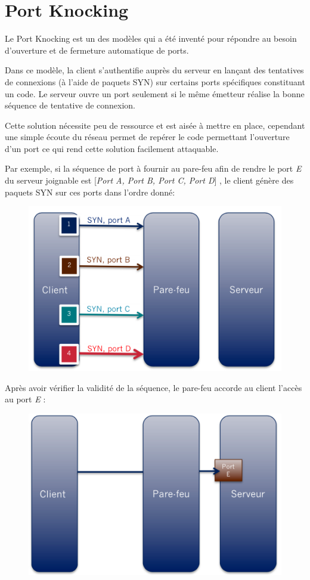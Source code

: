 \chapter{Port Knocking}

Le Port Knocking est un des modèles qui a été inventé pour répondre au besoin d'ouverture et de fermeture automatique de ports.

Dans ce modèle, la client s'authentifie auprès du serveur en lançant des tentatives de connexions (à l'aide de paquets SYN) sur certains ports spécifiques constituant un code. Le serveur ouvre un port seulement si le même émetteur réalise la bonne séquence de tentative de connexion.

Cette solution nécessite peu de ressource et est aisée à mettre en place, cependant une simple écoute du réseau permet de repérer le code permettant l'ouverture d'un port ce qui rend cette solution facilement attaquable.

Par exemple, si la séquence de port à fournir au pare-feu afin de rendre le port \emph{E} du serveur joignable est [\emph{Port A, Port B, Port C, Port D}] , le client génère des paquets SYN sur ces ports dans l'ordre donné:
\begin{figure}[h]

\centerline{\includegraphics[scale=0.4]{portknocking1}}

\end{figure}

Après avoir vérifier la validité de la séquence, le pare-feu accorde au client l'accès au port \emph{E} : 

\begin{figure}[h]

\centerline{\includegraphics[scale=0.4]{portknocking2}}

\end{figure}